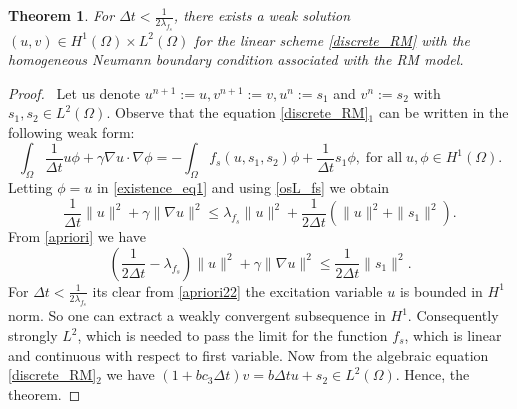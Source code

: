 \documentclass[11pt]{article}
\newtheorem{theorem}{Theorem}[section]
\begin{document}
\begin{theorem}\label{existence_thm}
    For $\Delta t<\frac{1}{2\lambda_{f_s}}$, there exists a weak solution $(u, v)\in H^1(\Omega)\times L^2(\Omega)$ for the linear scheme \eqref{discrete_RM} with the homogeneous Neumann boundary condition associated with the RM model.
\end{theorem}
\begin{proof}
   ~Let us denote $u^{n+1}:=u, v^{n+1}:=v, u^n:=s_1$ and $v^n:=s_2$ with $s_1, s_2\in L^2(\Omega)$. Observe that the equation \eqref{discrete_RM}$_1$ can be written in the following weak form: 
   \begin{equation}\label{existence_eq1}
       \int_{\Omega} \frac{1}{\Delta t} u \phi + \gamma  \nabla u \cdot \nabla \phi = -\int_{\Omega}  {f}_s(u, s_1, s_2)\phi + \frac{1}{\Delta t} s_1 \phi ,\; \text{for all} \; u, \phi \in H^1(\Omega).
   \end{equation}
   Letting $\phi=u$ in \eqref{existence_eq1} and using \ref{osL_fs} we obtain 
   \begin{equation}\label{apriori}
      \frac{1}{\Delta t} \parallel u\parallel^2 + \gamma \parallel \nabla u\parallel^2 \leq \lambda_{f_s} \parallel u\parallel^2 + \frac{1}{2\Delta t} \left( \parallel u\parallel^2 + \parallel s_1\parallel^2\right).  
   \end{equation}
   From \eqref{apriori} we have 
   \begin{equation}\label{apriori22}
      \left(\frac{1}{2\Delta t} - \lambda_{f_s} \right)\parallel u\parallel^2 + \gamma \parallel \nabla u\parallel^2 \leq  \frac{1}{2\Delta t}  \parallel s_1\parallel^2.  
   \end{equation}
   For $\Delta t<\frac{1}{2\lambda_{f_s}}$ its clear from \eqref{apriori22} the excitation variable $u$ is bounded in $H^1$ norm. So one can extract a weakly convergent subsequence in $H^1$. Consequently strongly $L^2$, which is needed to pass the limit for the function $f_s$, which is linear and continuous with respect to first variable. 
    Now from the algebraic equation \eqref{discrete_RM}$_2$ we have $(1+bc_3\Delta t)v=b\Delta t u +s_2 \in L^2(\Omega)$. Hence, the theorem.
\end{proof}
\end{document}
